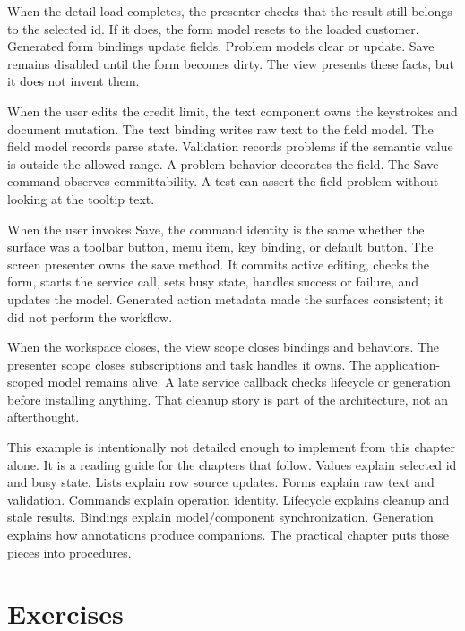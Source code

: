 When the detail load completes, the presenter checks that the result still belongs to the selected id. If it does, the form model resets to the loaded customer. Generated form bindings update fields. Problem models clear or update. Save remains disabled until the form becomes dirty. The view presents these facts, but it does not invent them.

When the user edits the credit limit, the text component owns the keystrokes and document mutation. The text binding writes raw text to the field model. The field model records parse state. Validation records problems if the semantic value is outside the allowed range. A problem behavior decorates the field. The Save command observes committability. A test can assert the field problem without looking at the tooltip text.

When the user invokes Save, the command identity is the same whether the surface was a toolbar button, menu item, key binding, or default button. The screen presenter owns the save method. It commits active editing, checks the form, starts the service call, sets busy state, handles success or failure, and updates the model. Generated action metadata made the surfaces consistent; it did not perform the workflow.

When the workspace closes, the view scope closes bindings and behaviors. The presenter scope closes subscriptions and task handles it owns. The application-scoped model remains alive. A late service callback checks lifecycle or generation before installing anything. That cleanup story is part of the architecture, not an afterthought.

This example is intentionally not detailed enough to implement from this chapter alone. It is a reading guide for the chapters that follow. Values explain selected id and busy state. Lists explain row source updates. Forms explain raw text and validation. Commands explain operation identity. Lifecycle explains cleanup and stale results. Bindings explain model/component synchronization. Generation explains how annotations produce companions. The practical chapter puts those pieces into procedures.

\section{Exercises}


